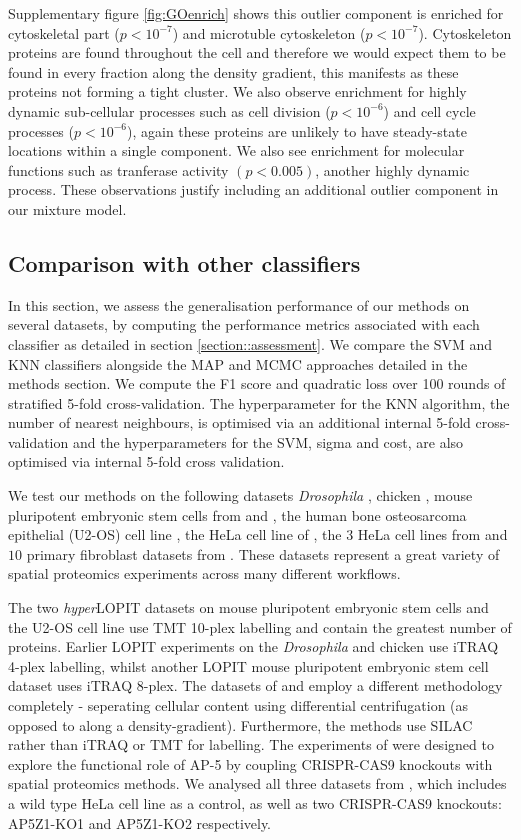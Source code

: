 \documentclass[12pt,english]{article}
\begin{document}
Supplementary figure \ref{fig:GOenrich} shows this outlier component is enriched for cytoskeletal part ($p <10^{-7}$) and microtuble cytoskeleton
($p <10^{-7}$). Cytoskeleton proteins are found throughout the cell and therefore we would expect them to be found
in every fraction along the density gradient, this manifests as these proteins not forming a tight cluster. We also observe enrichment for highly dynamic sub-cellular processes such as cell division ($p <10^{-6}$) and cell cycle processes ($p <10^{-6}$), again these proteins are
unlikely to have steady-state locations within a single component. We also see enrichment for molecular functions
such as tranferase activity $(p < 0.005)$, another highly dynamic process. These observations justify including an additional outlier
component in our mixture model.


\clearpage
\subsection{Comparison with other classifiers}
In this section, we assess the generalisation performance of our methods
on several datasets, by computing the performance metrics associated with each
classifier as detailed in section
\ref{section::assessment}. We compare the SVM and KNN classifiers alongside
the MAP and MCMC approaches detailed in the methods section. We compute the F1 score
and quadratic loss over 100 rounds of stratified 5-fold cross-validation. The hyperparameter
for the KNN algorithm, the number of nearest neighbours, is optimised
via an additional internal 5-fold cross-validation and the hyperparameters for the
SVM, sigma and cost, are also optimised via internal 5-fold cross validation.

We test our methods on the following datasets  \textit{Drosophila}
\citep{Tan:2009}, chicken \citep{hall:2009}, mouse pluripotent embryonic stem cells
from \cite{hyper} and \cite{Breckels:2016}, the human bone osteosarcoma epithelial
(U2-OS) cell line \citep{Thul:2017}, the HeLa cell line of
\cite{Itzhak:2016}, the $3$ HeLa cell lines from \cite{Hirst:2018} and $10$ primary
fibroblast datasets from \cite{Jean_Beltran:2016}.
These datasets represent a great variety of spatial proteomics experiments across many different
workflows.

The two \textit{hyper}LOPIT datasets on mouse pluripotent embryonic stem cells
and the U2-OS cell line use TMT 10-plex labelling and contain the greatest number of proteins.
Earlier LOPIT experiments on the \textit{Drosophila} and chicken use iTRAQ 4-plex labelling,
whilst another LOPIT mouse pluripotent embryonic stem cell dataset uses iTRAQ 8-plex. The datasets
of \cite{Itzhak:2016} and \cite{Hirst:2018} employ a different methodology completely -
seperating cellular content using differential centrifugation (as opposed to along a density-gradient).
Furthermore, the methods use SILAC rather than iTRAQ or TMT for labelling. The experiments of
\cite{Hirst:2018} were designed to explore the functional role of AP-5 by coupling CRISPR-CAS9 knockouts with
spatial proteomics methods. We analysed all three datasets from \cite{Hirst:2018}, which includes a
wild type HeLa cell line as a control, as well as two CRISPR-CAS9 knockouts: AP5Z1-KO1 and AP5Z1-KO2 respectively.
\end{document}
